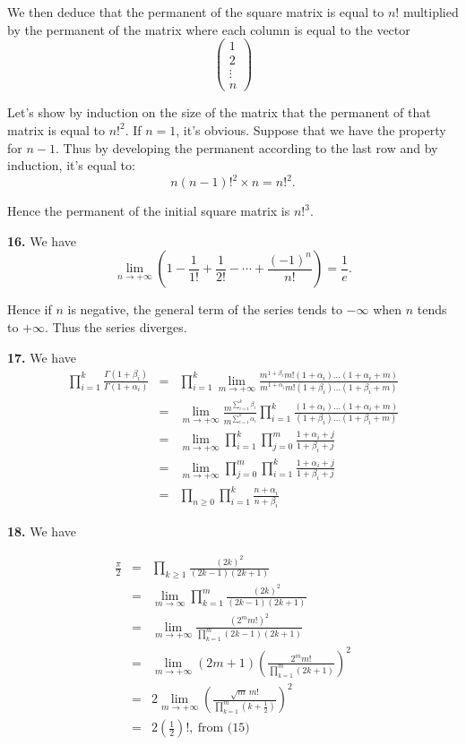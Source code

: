 \documentclass[a4paper,12pt]{article}
\newcommand{\newpar}[1]{\bigskip \noindent \textbf{#1.}}
\begin{document}
We then deduce that the permanent of the square matrix is equal to
$n!$ multiplied by the permanent of the matrix where each column is
equal to the vector
\[ \left(
\begin{array}{c}
  1 \\
  2 \\
  \vdots \\
  n
\end{array}
\right)
\]

Let's show by induction on the size of the matrix that the permanent
of that matrix is equal to $n!^2$.  If $n=1$, it's obvious.  Suppose
that we have the property for $n-1$.  Thus by developing the permanent
according to the last row and by induction, it's equal to:
\[ n(n-1)!^2 \times n = n!^2.\]

Hence the permanent of the initial square matrix is $n!^3$.

\newpar{16} We have
\[ \lim_{n \to +\infty} \left(1 -\frac{1}{1!} + \frac{1}{2!} - \cdots
+ \frac{(-1)^n}{n!} \right) = \frac{1}{e} .\]

Hence if $n$ is negative, the general term of the series tends to
$-\infty$ when $n$ tends to $+\infty$.  Thus the series diverges.

\newpar{17} We have
\begin{eqnarray*}
  \prod_{i=1}^k
  \frac{\Gamma(1+\beta_i)}{\Gamma(1+\alpha_i)} &=&
  \prod_{i=1}^k \lim_{m\to +\infty} \frac{m^{1+\beta_i}
    m!(1+\alpha_i) \ldots (1+\alpha_i+m)}
       {m^{1+\alpha_i}m!(1+\beta_i)\ldots (1+\beta_i+m)} \\
  &=& \lim_{m\to +\infty}
  \frac{m^{\sum_{i=1}^k\beta_i}}{m^{\sum_{i=1}^k\alpha_i}}
  \prod_{i=1}^k \frac{(1+\alpha_i) \ldots (1+\alpha_i +
    m)}{(1+\beta_i) \ldots (1+\beta_i+m)} \\
  &=& \lim_{m\to+\infty} \prod_{i=1}^k \prod_{j=0}^m \frac{1+\alpha_i
    + j}{1+\beta_i+j} \\
  &=& \lim_{m\to+\infty} \prod_{j=0}^m \prod_{i=1}^k \frac{1+\alpha_i
    + j}{1+\beta_i+j} \\
  &=& \prod_{n\ge 0} \prod_{i=1}^k \frac{n+\alpha_i}{n+\beta_i}
\end{eqnarray*}

\newpar{18} We have

\begin{eqnarray*}
  \frac{\pi}{2} &=& \prod_{k\ge 1}\frac{(2k)^2}{(2k-1)(2k+1)} \\
  &=& \lim_{m\to \infty}\prod_{k=1}^m \frac{(2k)^2}{(2k-1)(2k+1)} \\
  &=& \lim_{m\to +\infty} \frac{(2^m
    m!)^2}{\prod_{k=1}^m(2k-1)(2k+1)}\\
  &=& \lim_{m\to +\infty} (2m+1)\left( \frac{2^m m!}{\prod_{k=1}^m
    (2k+1)} \right)^2 \\
  &=& 2 \lim_{m\to+\infty} \left( \frac{\sqrt{m}\,
    m!}{\prod_{k=1}^m\left(k + \frac{1}{2}\right) }\right)^2 \\
  &=& 2 \left(\frac{1}{2}\right)!,\ \mbox{from (15)}
\end{eqnarray*}
\end{document}
